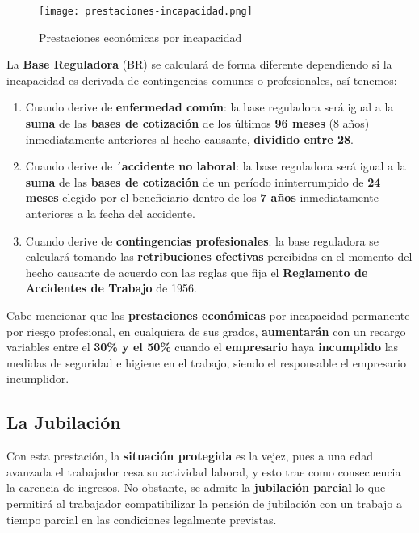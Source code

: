 \begin{itemize}
    \begin{figure}[H]
        \centering
        \texttt{[image: prestaciones-incapacidad.png]}
        \caption{Prestaciones económicas por incapacidad}
    \end{figure}

    La \textbf{Base Reguladora} (BR) se calculará de forma diferente dependiendo si la incapacidad es derivada de contingencias comunes o profesionales, así tenemos:

    \begin{enumerate}
        \item Cuando derive de \textbf{enfermedad común}: la base reguladora será igual a la \textbf{suma} de las 	\textbf{bases de cotización} de los últimos \textbf{96 meses} (8 años) inmediatamente anteriores al hecho causante, \textbf{dividido entre 28}.

        \item Cuando derive de ´\textbf{accidente no laboral}: la base reguladora será igual a la \textbf{suma} de las \textbf{bases de cotización} de un período ininterrumpido de \textbf{24 meses} elegido por el beneficiario  dentro de los \textbf{7 años} inmediatamente anteriores a la fecha del accidente.

        \item Cuando derive de \textbf{contingencias profesionales}: la base reguladora se calculará tomando las \textbf{retribuciones efectivas} percibidas en el momento del hecho causante de acuerdo con las reglas que fija el \textbf{Reglamento de Accidentes de Trabajo} de 1956.
    \end{enumerate}
\end{itemize}

Cabe mencionar que las \textbf{prestaciones económicas} por incapacidad permanente por riesgo profesional, en cualquiera de sus grados, \textbf{aumentarán} con un recargo variables entre el \textbf{30\% y el 50\%} cuando el \textbf{empresario} haya \textbf{incumplido} las medidas de seguridad e higiene en el trabajo, siendo el responsable el empresario incumplidor.

\subsection{La Jubilación}
Con esta prestación, la \textbf{situación protegida} es la vejez, pues a una edad avanzada el trabajador cesa su actividad laboral, y esto trae como consecuencia la carencia de ingresos. No obstante, se admite la \textbf{jubilación parcial} lo que permitirá al trabajador compatibilizar la pensión de jubilación con un trabajo a tiempo parcial en las condiciones legalmente previstas.

